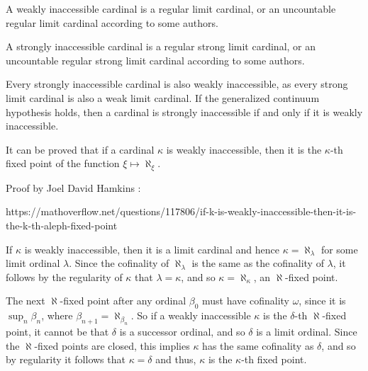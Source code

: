 \documentclass[10pt]{article}
\begin{document}
A weakly inaccessible cardinal is a regular limit cardinal, or an uncountable regular limit cardinal according to some authors.

A strongly inaccessible cardinal is a regular strong limit cardinal, or an uncountable regular strong limit cardinal according to some authors.

Every strongly inaccessible cardinal is also weakly inaccessible, as every strong limit cardinal is also a weak limit cardinal. If the generalized continuum hypothesis holds, then a cardinal is strongly inaccessible if and only if it is weakly inaccessible.

\bigskip

It can be proved that if a cardinal \( \kappa \) is weakly inaccessible, then it is the \(\kappa\)-th fixed point of the function \( \xi \mapsto \aleph_\xi \). 

Proof by Joel David Hamkins :

https://mathoverflow.net/questions/117806/if-k-is-weakly-inaccessible-then-it-is-the-k-th-aleph-fixed-point 

If $\kappa$ is weakly inaccessible, then it is a limit cardinal and hence $\kappa=\aleph_\lambda$
for some limit ordinal $\lambda$. Since the cofinality of $\aleph_\lambda$ is
the same as the cofinality of $\lambda$, it follows by the regularity of $\kappa$ that
$\lambda=\kappa$, and so $\kappa=\aleph_\kappa$, an $\aleph$-fixed point. 

The next
$\aleph$-fixed point after any ordinal $\beta_0$ must have
cofinality $\omega$, since it is $\sup_n\beta_n$, where
$\beta_{n+1}=\aleph_{\beta_n}$. So if a weakly inaccessible
$\kappa$ is the $\delta$-th $\aleph$-fixed point, it cannot be
that $\delta$ is a successor ordinal, and so $\delta$ is a limit ordinal. Since the
$\aleph$-fixed points are closed, this implies $\kappa$ has the same cofinality as $\delta$, and so by regularity it follows that $\kappa=\delta$ and thus, $\kappa$ is the $\kappa$-th fixed point.

\bigskip
 
\end{document}
